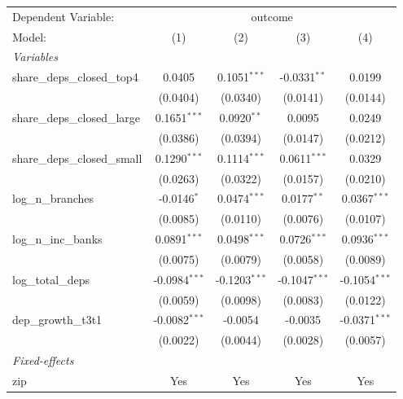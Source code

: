 \begingroup
\centering
\begin{tabular}{lcccc}
   \tabularnewline \midrule \midrule
   Dependent Variable: & \multicolumn{4}{c}{outcome}\\
   Model:                        & (1)             & (2)             & (3)             & (4)\\  
   \midrule
   \emph{Variables}\\
   share\_deps\_closed\_top4     & 0.0405          & 0.1051$^{***}$  & -0.0331$^{**}$  & 0.0199\\   
                                 & (0.0404)        & (0.0340)        & (0.0141)        & (0.0144)\\   
   share\_deps\_closed\_large    & 0.1651$^{***}$  & 0.0920$^{**}$   & 0.0095          & 0.0249\\   
                                 & (0.0386)        & (0.0394)        & (0.0147)        & (0.0212)\\   
   share\_deps\_closed\_small    & 0.1290$^{***}$  & 0.1114$^{***}$  & 0.0611$^{***}$  & 0.0329\\   
                                 & (0.0263)        & (0.0322)        & (0.0157)        & (0.0210)\\   
   log\_n\_branches              & -0.0146$^{*}$   & 0.0474$^{***}$  & 0.0177$^{**}$   & 0.0367$^{***}$\\   
                                 & (0.0085)        & (0.0110)        & (0.0076)        & (0.0107)\\   
   log\_n\_inc\_banks            & 0.0891$^{***}$  & 0.0498$^{***}$  & 0.0726$^{***}$  & 0.0936$^{***}$\\   
                                 & (0.0075)        & (0.0079)        & (0.0058)        & (0.0089)\\   
   log\_total\_deps              & -0.0984$^{***}$ & -0.1203$^{***}$ & -0.1047$^{***}$ & -0.1054$^{***}$\\   
                                 & (0.0059)        & (0.0098)        & (0.0083)        & (0.0122)\\   
   dep\_growth\_t3t1             & -0.0082$^{***}$ & -0.0054         & -0.0035         & -0.0371$^{***}$\\   
                                 & (0.0022)        & (0.0044)        & (0.0028)        & (0.0057)\\   
   \midrule
   \emph{Fixed-effects}\\
   zip                           & Yes             & Yes             & Yes             & Yes\\  

\end{tabular}
